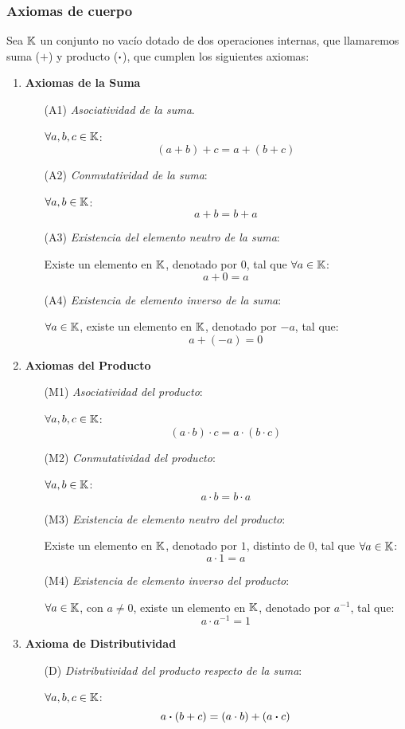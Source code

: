 \subsubsection{Axiomas de cuerpo}

Sea $\mathbb{K}$ un conjunto no vacío dotado de dos operaciones internas, que llamaremos suma ($+$) y producto ($\boldsymbol{\cdot}$), que cumplen los siguientes axiomas:

\begin{enumerate}
	\item \textbf{Axiomas de la Suma}
	
	\begin{itemize}
		\item[(A1)] \textit{Asociatividad de la suma}.
		
		$\forall a, b, c \in \mathbb{K}$:
		\[(a+b)+c=a+(b+c) \]
		\item[(A2)] \textit{Conmutatividad de la suma}:
		
		$\forall a, b \in \mathbb{K}$:
		\[ a + b = b + a \]
		\item[(A3)] \textit{Existencia del elemento neutro de la suma}:
		
		Existe un elemento en $\mathbb{K}$, denotado por $0$, tal que $\forall a \in \mathbb{K}$:
		\[ a + 0 = a \]
		\item[(A4)] \textit{Existencia de elemento inverso de la suma}:
		
		$\forall a \in \mathbb{K}$, existe un elemento en $\mathbb{K}$, denotado por $-a$, tal que:
		\[ a + (-a) = 0 \]
	\end{itemize}
	
	\item \textbf{Axiomas del Producto}
	
	\begin{itemize}
		\item[(M1)] \textit{Asociatividad del producto}:
		
		\( \forall a, b, c \in \mathbb{K} \):
		\[ (a \cdot b) \cdot c = a \cdot (b \cdot c) \]
		\item[(M2)] \textit{Conmutatividad del producto}:
		
		\( \forall a, b \in \mathbb{K} \):
		\[a \cdot b = b \cdot a\]
		\item[(M3)] \textit{Existencia de elemento neutro del producto}:
		
		Existe un elemento en $\mathbb{K}$, denotado por $1$, distinto de $0$, tal que $\forall a \in \mathbb{K}$: \[a \cdot 1 = a\]
		\item[(M4)] \textit{Existencia de elemento inverso del producto}:
		
		$\forall a \in \mathbb{K}$,  con $a \ne 0$, existe un elemento en $\mathbb{K}$, denotado por $a^{-1}$, tal que:
		\[a \cdot a^{-1} = 1\]
	\end{itemize}
	
	\item \textbf{Axioma de Distributividad}
	\begin{itemize}
		\item[(D)] \textit{Distributividad del producto respecto de la suma}:
		
		$\forall a, b, c \in \mathbb{K}$:
		\[a \boldsymbol{\cdot} (b+c) = (a \cdot b) + (a \boldsymbol{\cdot} c)\]
	\end{itemize}
\end{enumerate}

